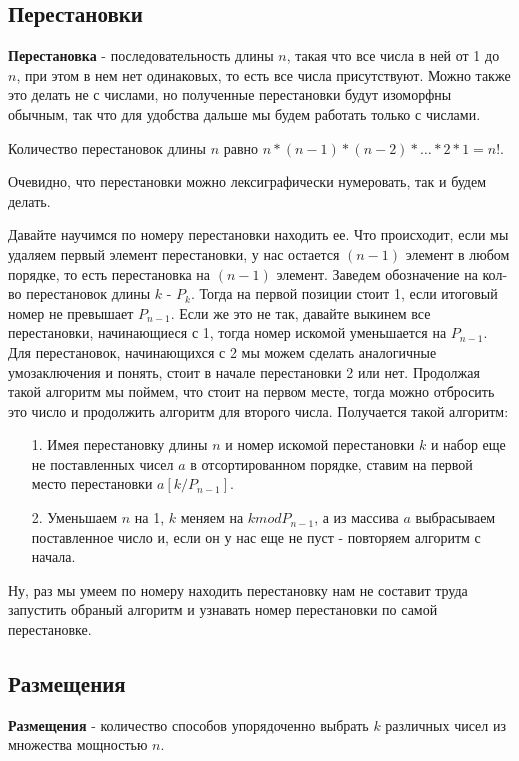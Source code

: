\documentclass{article}
\begin{document}
\subsection{Перестановки}
\textbf{Перестановка} - последовательность длины $n$, такая что все числа в ней от 1 до $n$, при этом в нем нет одинаковых, то есть все числа присутствуют. Можно также это делать не с числами, но полученные перестановки будут изоморфны обычным, так что для удобства дальше мы будем работать только с числами.

Количество перестановок длины $n$ равно $n * (n-1)*(n-2)*\dots *2*1 = n!$.

Очевидно, что перестановки можно лексиграфически нумеровать, так и будем делать.

Давайте научимся по номеру перестановки находить ее. Что происходит, если мы удаляем первый элемент перестановки, у нас остается $(n-1)$ элемент в любом порядке, то есть перестановка на $(n-1)$ элемент. Заведем обозначение на кол-во перестановок длины $k$ - $P_k$. Тогда на первой позиции стоит 1, если итоговый номер не превышает $P_{n-1}$. Если же это не так, давайте выкинем все перестановки, начинающиеся с 1, тогда номер искомой уменьшается на $P_{n-1}$. Для перестановок, начинающихся с 2 мы можем сделать аналогичные умозаключения и понять, стоит в начале перестановки 2 или нет. Продолжая такой алгоритм мы поймем, что стоит на первом месте, тогда можно отбросить это число и продолжить алгоритм для второго числа. Получается такой алгоритм:
\begin{enumerate}
    \item [1.] Имея перестановку длины $n$ и номер искомой перестановки $k$ и набор еще не поставленных чисел $a$ в отсортированном порядке, ставим на первой место перестановки $a[k / P_{n - 1}]$.
    \item[2.] Уменьшаем $n$ на 1, $k$ меняем на $k mod P_{n - 1}$, а из массива $a$ выбрасываем поставленное число и, если он у нас еще не пуст - повторяем алгоритм с начала.
\end{enumerate} 

Ну, раз мы умеем по номеру находить перестановку нам не составит труда запустить обраный алгоритм и узнавать номер перестановки по самой перестановке.

\subsection{Размещения}
\textbf{Размещения} - количество способов упорядоченно выбрать $k$ различных чисел из множества мощностью $n$.
\end{document}
